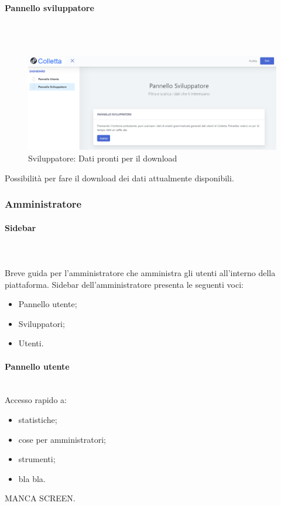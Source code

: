     	\paragraph{Pannello sviluppatore}\mbox{}\\ \\
    		\begin{figure}[H]
			\centering
			\includegraphics[width=17cm]{sez/img/sviluppatore/datipronti.png}
			\caption{Sviluppatore: Dati pronti per il download}\label{fig:1}
			\end{figure}
		  Possibilità per fare il download dei dati attualmente disponibili.




	\newpage
	\subsubsection{Amministratore}
		\paragraph{Sidebar}\mbox{}\\ \\
		  Breve guida per l'amministratore che amministra gli utenti all'interno della piattaforma. Sidebar dell'amministratore presenta le seguenti voci:
			\begin{itemize}
			\item Pannello utente;
			\item Sviluppatori;
			\item Utenti.
			\end{itemize}



		\paragraph{Pannello utente}\mbox{}\\
		  Accesso rapido a:
			\begin{itemize}
			\item statistiche;
			\item cose per amministratori;
			\item strumenti;
			\item bla bla.
			\end{itemize}
			  MANCA SCREEN.




